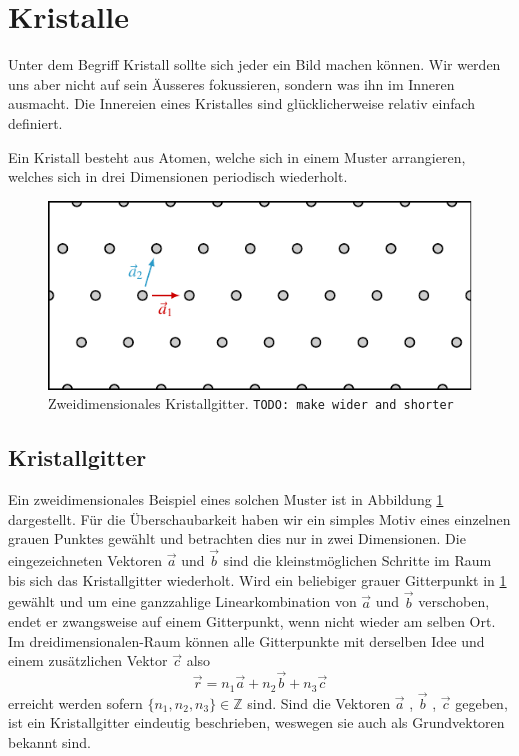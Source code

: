 \section{Kristalle}
Unter dem Begriff Kristall sollte sich jeder ein Bild machen können. 
Wir werden uns aber nicht auf sein Äusseres fokussieren, sondern was ihn im Inneren ausmacht.
Die Innereien eines Kristalles sind glücklicherweise relativ einfach definiert.
\begin{definition}[Kristall]
    Ein Kristall besteht aus Atomen, welche sich in einem Muster arrangieren, welches sich in drei Dimensionen periodisch wiederholt.
\end{definition}

\begin{figure}
    \centering
    \includegraphics[]{papers/punktgruppen/figures/lattice}
    \caption{
        Zweidimensionales Kristallgitter.
        \texttt{TODO: make wider and shorter}
        \label{fig:punktgruppen:lattice}
    }
\end{figure}
\subsection{Kristallgitter}
Ein zweidimensionales Beispiel eines solchen Muster ist in Abbildung \ref{fig:punktgruppen:lattice} dargestellt.
Für die Überschaubarkeit haben wir ein simples Motiv eines einzelnen grauen Punktes gewählt und betrachten dies nur in zwei Dimensionen.
Die eingezeichneten Vektoren $\vec{a}$ und $\vec{b}$ sind die kleinstmöglichen Schritte im Raum bis sich das Kristallgitter wiederholt.
Wird ein beliebiger grauer Gitterpunkt in \ref{fig:punktgruppen:lattice} gewählt 
und um eine ganzzahlige Linearkombination von $\vec{a}$ und $\vec{b}$ verschoben, 
endet er zwangsweise auf einem Gitterpunkt, wenn nicht wieder am selben Ort.
Im dreidimensionalen-Raum können alle Gitterpunkte mit derselben Idee und einem zusätzlichen Vektor $\vec{c}$ also 
\[
    \vec{r} = n_1 \vec{a} + n_2 \vec{b} + n_3 \vec{c}   
\]
erreicht werden sofern $\{n_1,n_2,n_3\} \in \mathbb{Z}$ sind.
Sind die Vektoren  $\vec{a}$ , $\vec{b}$ , $\vec{c}$ gegeben,
ist ein Kristallgitter eindeutig beschrieben, weswegen sie auch als Grundvektoren bekannt sind.

